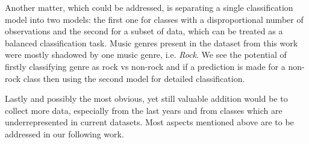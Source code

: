 Another matter, which could be addressed, is separating a single classification model into two models: the first one for classes with a disproportional number of observations and the second for a subset of data, which can be treated as a balanced classification task. Music genres present in the dataset from this work were mostly shadowed by one music genre, i.e. \textit{Rock}. We see the potential of firstly classifying genre as rock vs non-rock and if a prediction is made for a non-rock class then using the second model for detailed classification.

Lastly and possibly the most obvious, yet still valuable addition would be to collect more data, especially from the last years and from classes which are underrepresented in current datasets. Most aspects mentioned above are to be addressed in our following work. 
